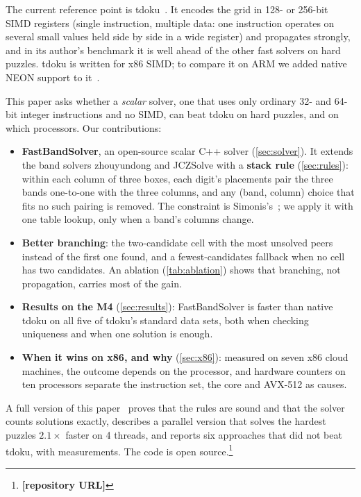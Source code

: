 \documentclass[11pt]{article}
\theoremstyle{definition}
\theoremstyle{plain}
\begin{document}
The current reference point is tdoku~\cite{dillon2019tdoku,dillon2019nerdsniped}. It encodes the grid in 128- or
256-bit SIMD registers (single instruction, multiple data: one instruction operates on several small values held side
by side in a wide register) and propagates strongly, and in its author's benchmark it is well ahead of the other fast
solvers on hard puzzles. tdoku is written for x86 SIMD; to compare it on ARM we added native NEON support to
it~\cite{kelly2026tdokuarm}.

This paper asks whether a \emph{scalar} solver, one that uses only ordinary 32- and 64-bit integer instructions and no SIMD, can beat tdoku on hard puzzles, and on which processors. Our contributions:
\begin{itemize}
\item \textbf{FastBandSolver}, an open-source scalar C++ solver (\cref{sec:solver}). It extends the band solvers
  zhouyundong and JCZSolve with a \textbf{stack rule} (\cref{sec:rules}): within each column of three boxes, each digit's
  placements pair the three bands one-to-one with the three columns, and any (band, column) choice that fits no such
  pairing is removed. The constraint is Simonis's~\cite{simonis2005sudoku}; we apply it with one table lookup, only when
  a band's columns change.
\item \textbf{Better branching}: the two-candidate cell with the most unsolved peers instead of the first one found,
  and a fewest-candidates fallback when no cell has two candidates. An ablation (\cref{tab:ablation}) shows that
  branching, not propagation, carries most of the gain.
\item \textbf{Results on the M4} (\cref{sec:results}): FastBandSolver is faster than native tdoku on all five of
  tdoku's standard data sets, both when checking uniqueness and when one solution is enough.
\item \textbf{When it wins on x86, and why} (\cref{sec:x86}): measured on seven x86 cloud machines, the outcome depends
  on the processor, and hardware counters on ten processors separate the instruction set, the core and AVX-512 as
  causes.
\end{itemize}
A full version of this paper~\cite{kelly2026full} proves that the rules are sound and that the solver counts solutions
exactly, describes a parallel version that solves the hardest puzzles $2.1\times$ faster on 4 threads, and reports six
approaches that did not beat tdoku, with measurements. The code is open source.\footnote{\textbf{[repository URL]}}
\end{document}
